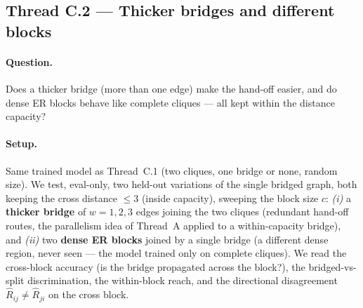 \documentclass[11pt,a4paper]{article}
\begin{document}
\subsection{Thread C.2 --- Thicker bridges and different blocks}
\label{sec:res-thick-bridges}
\paragraph{Question.} Does a thicker bridge (more than one edge) make the hand-off easier, and do
dense ER blocks behave like complete cliques --- all kept within the distance capacity?

\paragraph{Setup.} Same trained model as Thread~C.1 (two cliques, one bridge or none, random size). We
test, eval-only, two held-out variations of the single bridged graph, both keeping the cross distance
$\le3$ (inside capacity), sweeping the block size $c$: \emph{(i)} a \textbf{thicker bridge} of $w=1,2,3$
edges joining the two cliques (redundant hand-off routes, the parallelism idea of Thread~A applied to a
within-capacity bridge), and \emph{(ii)} two \textbf{dense ER blocks} joined by a single bridge (a
different dense region, never seen --- the model trained only on complete cliques). We read the
cross-block accuracy (is the bridge propagated across the block?), the bridged-vs-split discrimination,
the within-block reach, and the directional disagreement $\hat R_{ij}\neq\hat R_{ji}$ on the cross block.
\end{document}
